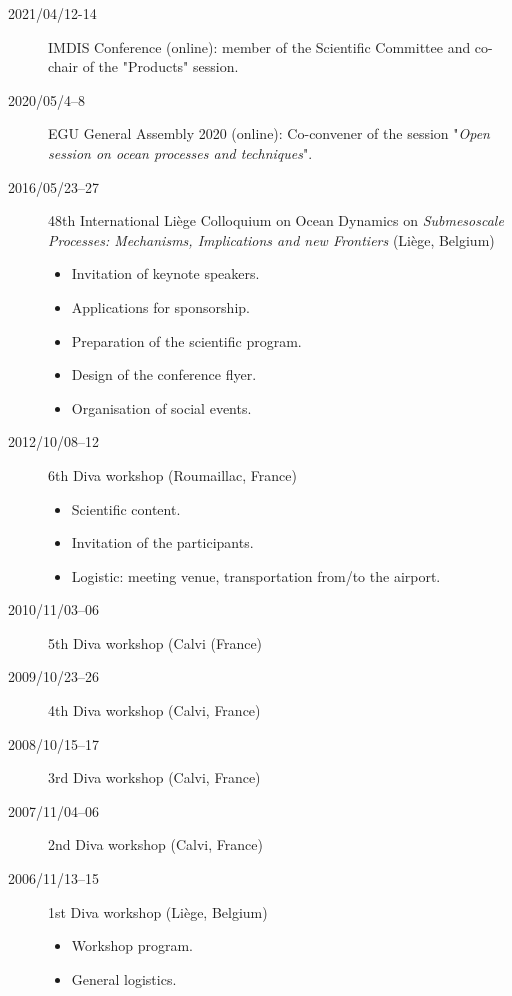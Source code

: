 \documentclass[10pt,a4paper,svgnames]{article}
\begin{document}
\begin{description}

\item[2021/04/12-14] IMDIS Conference (online): member of the Scientific Committee and co-chair of the "Products" session.

\item[2020/05/4--8] EGU General Assembly 2020 (online): Co-convener of the session "\textit{Open session on ocean processes and techniques}".

\item[2016/05/23--27] 48th International Li\`{e}ge Colloquium on Ocean Dynamics on \textit{Submesoscale Processes: Mechanisms, Implications and new Frontiers} (Li\`{e}ge, Belgium)
\begin{itemize}
\item Invitation of keynote speakers.
\item Applications for sponsorship.
\item Preparation of the scientific program.
\item Design of the conference flyer.
\item Organisation of social events.
\end{itemize}

\item[2012/10/08--12] 6th Diva workshop (Roumaillac, France)
\begin{itemize}
\item Scientific content.
\item Invitation of the participants.
\item Logistic: meeting venue, transportation from/to the airport.
\end{itemize}

\item[2010/11/03--06] 5th Diva workshop (Calvi (France)
\item[2009/10/23--26] 4th Diva workshop (Calvi, France)
\item[2008/10/15--17] 3rd Diva workshop (Calvi, France)
\item[2007/11/04--06] 2nd Diva workshop (Calvi, France)
\item[2006/11/13--15] 1st Diva workshop (Li\`{e}ge, Belgium)
\begin{itemize}
\item Workshop program.
\item General logistics. 
\end{itemize}
\end{description}
\end{document}
